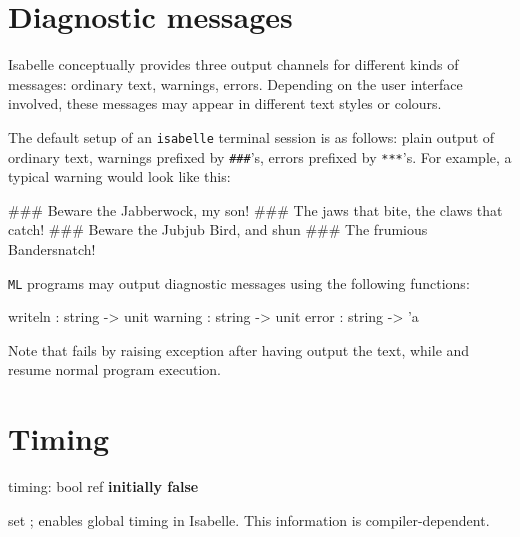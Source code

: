 \section{Diagnostic messages}

Isabelle conceptually provides three output channels for different kinds of
messages: ordinary text, warnings, errors.  Depending on the user interface
involved, these messages may appear in different text styles or colours.

The default setup of an \texttt{isabelle} terminal session is as
follows: plain output of ordinary text, warnings prefixed by
\texttt{\#\#\#}'s, errors prefixed by \texttt{***}'s.  For example, a
typical warning would look like this:
\begin{ttbox}
\#\#\# Beware the Jabberwock, my son!
\#\#\# The jaws that bite, the claws that catch!
\#\#\# Beware the Jubjub Bird, and shun
\#\#\# The frumious Bandersnatch!
\end{ttbox}

\texttt{ML} programs may output diagnostic messages using the
following functions:
\begin{ttbox}
writeln : string -> unit
warning : string -> unit
error   : string -> 'a
\end{ttbox}
Note that  fails by raising exception 
after having output the text, while  and
 resume normal program execution.


\section{Timing}
\begin{ttbox} 
timing: bool ref \hfill{\bf initially false}
\end{ttbox}

\begin{ttdescription}
\item[set \ttindexbold{timing};] enables global timing in Isabelle.
  This information is compiler-dependent.
\end{ttdescription}



